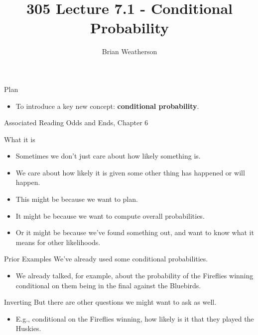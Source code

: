 \documentclass[
  ignorenonframetext,
]{beamer}
\title{305 Lecture 7.1 - Conditional Probability}
\author{Brian Weatherson}
\date{}
\providecommand{\tightlist}{%
  \setlength{\itemsep}{0pt}\setlength{\parskip}{0pt}}
\renewcommand{\,}{\text{, }}
\begin{document}
\frame{\titlepage}

\begin{frame}{Plan}
\protect\hypertarget{plan}{}
\begin{itemize}
\tightlist
\item
  To introduce a key new concept: \textbf{conditional probability}.
\end{itemize}
\end{frame}

\begin{frame}{Associated Reading}
\protect\hypertarget{associated-reading}{}
Odds and Ends, Chapter 6
\end{frame}

\begin{frame}{What it is}
\protect\hypertarget{what-it-is}{}
\begin{itemize}
\tightlist
\item
  Sometimes we don't just care about how likely something is.
\item
  We care about how likely it is given some other thing has happened or
  will happen. \pause
\item
  This might be because we want to plan. \pause
\item
  It might be because we want to compute overall probabilities. \pause
\item
  Or it might be because we've found something out, and want to know
  what it means for other likelihoods.
\end{itemize}
\end{frame}

\begin{frame}{Prior Examples}
\protect\hypertarget{prior-examples}{}
We've already used some conditional probabilities.

\begin{itemize}
\tightlist
\item
  We already talked, for example, about the probability of the Fireflies
  winning conditional on them being in the final against the Bluebirds.
\end{itemize}
\end{frame}

\begin{frame}{Inverting}
\protect\hypertarget{inverting}{}
But there are other questions we might want to ask as well.

\begin{itemize}[<+->]
\tightlist
\item
  E.g., conditional on the Fireflies winning, how likely is it that they
  played the Huskies.
\end{itemize}
\end{frame}
\end{document}
